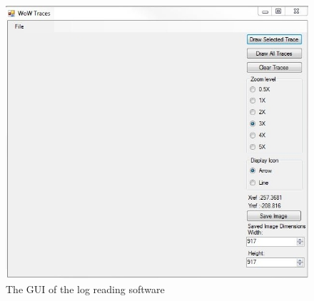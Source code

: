 \begin{figure}[htbp]  %
\centering
\includegraphics[scale = 0.8]{wowtraces1.jpg}	
\caption{The GUI of the log reading software}
\label{wowtraces}
\end{figure}



%

